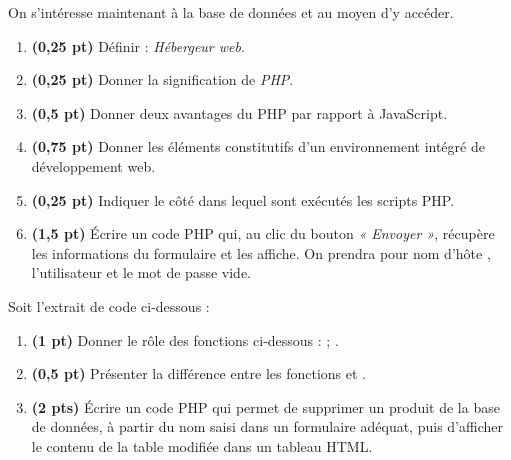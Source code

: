 \noindent On s'intéresse maintenant à la base de données  et au moyen d'y accéder.

\begin{enumerate}[label=\textbf{\arabic*.}]
\item \textbf{(0,25 pt)} Définir : \emph{Hébergeur web}.
\item \textbf{(0,25 pt)} Donner la signification de \emph{PHP}.
\item \textbf{(0,5 pt)} Donner deux avantages du PHP par rapport à JavaScript.
\item \textbf{(0,75 pt)} Donner les éléments constitutifs d'un environnement intégré de
développement web.
\item \textbf{(0,25 pt)} Indiquer le côté dans lequel sont exécutés les scripts PHP.
\item \textbf{(1,5 pt)} Écrire un code PHP qui, au clic du bouton \emph{« Envoyer »},
récupère les informations du formulaire et les affiche. On prendra pour nom d'hôte
, l'utilisateur  et le mot de passe vide.
\end{enumerate}

\noindent Soit l'extrait de code ci-dessous :


\begin{enumerate}[label=\textbf{\arabic*.}, start=7]
\item \textbf{(1 pt)} Donner le rôle des fonctions ci-dessous :
 ; .
\item \textbf{(0,5 pt)} Présenter la différence entre les fonctions
 et .
\item \textbf{(2 pts)} Écrire un code PHP qui permet de supprimer un produit de la base de
données, à partir du nom saisi dans un formulaire adéquat, puis d'afficher le contenu de la
table modifiée dans un tableau HTML.
\end{enumerate}


